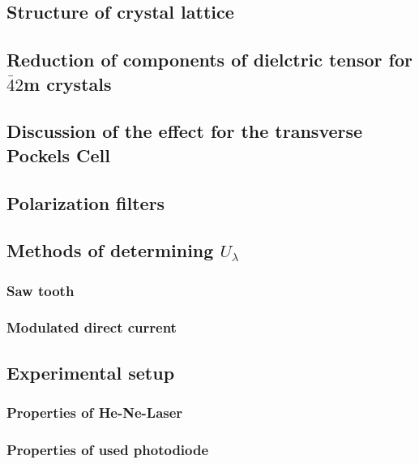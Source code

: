\subsection{Structure of crystal lattice}

\subsection{Reduction of components of dielctric tensor for $\bar{4}2$m crystals}

\subsection{Discussion of the effect for the transverse Pockels Cell}

\subsection{Polarization filters}

\subsection{Methods of determining $U_\lambda$}
\subsubsection{Saw tooth}
\subsubsection{Modulated direct current}

\subsection{Experimental setup}
\subsubsection{Properties of He-Ne-Laser}
\subsubsection{Properties of used photodiode}
